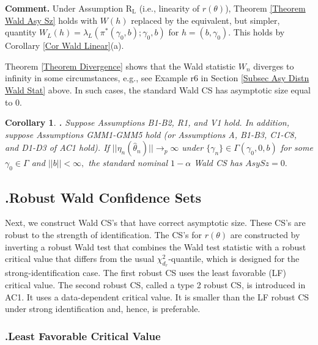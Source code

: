 \documentclass[12pt,titlepage,final,oneside,letterpaper]{article}
\newtheorem{corollary}{Corollary}[section]
\begin{document}
\noindent \textbf{Comment. }Under Assumption R$_{\text{L}}$ (i.e., linearity
of $r(\theta )$), Theorem \ref{Theorem Wald Asy Sz} holds with $W(h)$
replaced by the equivalent, but simpler, quantity $W_{L}(h)=\lambda _{L}(\pi
^{\ast }(\gamma _{0},b);\gamma _{0},b)$ for $h=(b,\gamma _{0}).$ This holds
by Corollary \ref{Cor Wald Linear}(a).\medskip

Theorem \ref{Theorem Divergence} shows that the Wald statistic $W_{n}$
diverges to infinity in some circumstances, e.g., see Example r6 in Section %
\ref{Subsec Asy Distn Wald Stat} above. In such cases, the standard Wald CS
has asymptotic size equal to 0.

\begin{corollary}
\hspace{-0.08in}\textbf{.} \label{Corollary Wald 2}Suppose Assumptions \emph{%
B1-B2, R1,} and \emph{V1} hold. In addition, suppose Assumptions \emph{%
GMM1-GMM5 }hold \emph{(}or Assumptions \emph{A,} \emph{B1-B3,} \emph{C1-C8,}
and \emph{D1-D3} of \emph{AC1 }hold\emph{).} If $||\eta _{n}(\widehat{\theta 
}_{n})||\rightarrow _{p}\infty $ under $\{\gamma _{n}\}\in \Gamma (\gamma
_{0},0,b)$ for some $\gamma _{0}\in \Gamma $ and $||b||<\infty ,$ the
standard nominal $1-\alpha $ Wald CS has $AsySz=0.$
\end{corollary}

\subsection{\hspace{-0.23in}\textbf{.}\hspace{0.18in}Robust Wald Confidence
Sets\label{Robust Wald CS Subsec}}

\hspace{0.25in}Next, we construct Wald CS's that have correct asymptotic
size. These CS's are robust to the strength of identification. The CS's for $%
r(\theta )$ are constructed by inverting a robust Wald test that combines
the Wald test statistic with a robust critical value that differs from the
usual $\chi _{d_{r}}^{2}$-quantile, which is designed for the
strong-identification case. The first robust CS uses the least favorable
(LF) critical value. The second robust CS, called a type 2 robust CS, is
introduced in AC1. It uses a data-dependent critical value. It is smaller
than the LF robust CS under strong identification and, hence, is preferable.

\subsubsection{\hspace{-0.19in}\textbf{.}\hspace{0.18in}Least Favorable
Critical Value\textbf{\label{LF Subsubsec}}}
\end{document}
